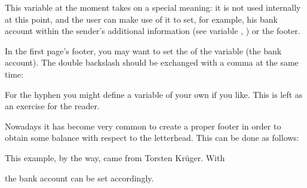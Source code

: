 \begin{Declaration}
\end{Declaration}%
This variable at the moment takes on a special meaning: it is not used
internally at this point, and the user can make use of it to set, for example,
his bank account within the sender's additional
information (see variable ,
) or the footer.%
%
\begin{Example}
  In the first page's footer, you may want to set the  of the
  variable  (the bank account). The double
  backslash should be exchanged with a comma at the same time:
\begin{lstcode}
\end{lstcode}
  For the hyphen you might define a variable of your own if you like.
  This is left as an exercise for the reader.

  Nowadays it has become very common to create a proper footer in
  order to obtain some balance with respect to the letterhead. This
  can be done as follows:
\begin{lstcode}
\end{lstcode}
  This example, by the way, came from Torsten Kr\"uger. With
\begin{lstcode}
\end{lstcode}
  the bank account can be set accordingly.
\end{Example}
